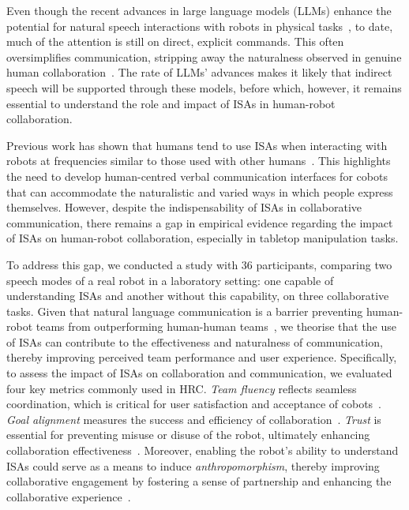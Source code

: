 Even though the recent advances in large language models (LLMs) enhance the potential for natural speech interactions with robots in physical tasks~\cite{singh2023progprompt, macdonald2024language, liang2023code, zhao2024large}, to date, much of the attention is still on direct, explicit commands. This often oversimplifies communication, stripping away the naturalness observed in genuine human collaboration~\cite{lamm2017pragmatics}. The rate of LLMs' advances makes it likely that indirect speech will be supported through these models, before which, however, it remains essential to understand the role and impact of ISAs in human-robot collaboration.

Previous work has shown that humans tend to use ISAs when interacting with robots at frequencies similar to those used with other humans~\cite{lee2010receptionist, bennett2017differences}. This highlights the need to develop human-centred verbal communication interfaces for cobots that can accommodate the naturalistic and varied ways in which people express themselves. However, despite the indispensability of ISAs in collaborative communication, there remains a gap in empirical evidence regarding the impact of ISAs on human-robot collaboration, especially in tabletop manipulation tasks. 

To address this gap, we conducted a study with 36 participants, comparing two speech modes of a real robot in a laboratory setting: one capable of understanding ISAs and another without this capability, on three collaborative tasks. Given that natural language communication is a barrier preventing human-robot teams from outperforming human-human teams~\cite{schelble2023investigating}, we theorise that the use of ISAs can contribute to the effectiveness and naturalness of communication, thereby improving perceived team performance and user experience. Specifically, to assess the impact of ISAs on collaboration and communication, we evaluated four key metrics commonly used in HRC. \textit{Team fluency} reflects seamless coordination, which is critical for user satisfaction and acceptance of cobots~\cite{hoffman2019evaluating, duan2021bridging}. \textit{Goal alignment} measures the success and efficiency of collaboration~\cite{salehzadeh2022purposeful, salas1995situation}. \textit{Trust} is essential for preventing misuse or disuse of the robot, ultimately enhancing collaboration effectiveness~\cite{abbass2018foundations, zhang2023investigating}. Moreover, enabling the robot's ability to understand ISAs could serve as a means to induce \textit{anthropomorphism}, thereby improving collaborative engagement by fostering a sense of partnership and enhancing the collaborative experience~\cite{zhang2021ideal, rezwana2022understanding}.

